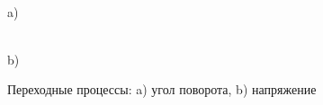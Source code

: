 \documentclass[a4paper,12pt]{article}
\begin{document}
	\begin{figure}[h!]
		\renewcommand{\figurename}{Рисунок}
		\begin{minipage}[h]{0.47\linewidth}
			 \\a) \\
		\end{minipage}
		\hfill
		\begin{minipage}[h]{0.47\linewidth}
			 \\b)
		\end{minipage}
		\caption{Переходные процессы: a) угол поворота, b) напряжение}
		\label{s_6}
	\end{figure}
\end{document}
